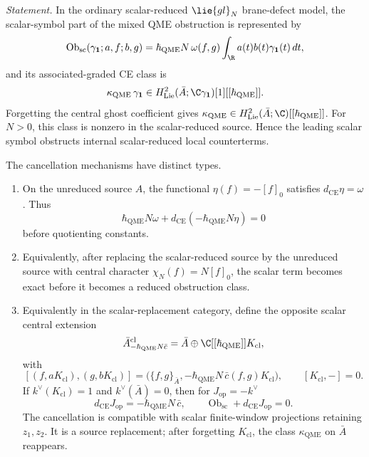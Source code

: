 \documentclass[11pt]{memoir}
\begin{document}
\begin{thm}
  \noindent\emph{Statement.}
  In the ordinary scalar-reduced \(\lie{gl}_N\) brane-defect model, the
  scalar-symbol part of the mixed QME obstruction is represented by
  \[
    \operatorname{Ob}_{\mathrm{sc}}(\gamma_{\mathbf 1};a,f;b,g)
    =
    \hbar_{\mathrm{QME}}N\,\omega(f,g)
    \int_\R a(t)b(t)\gamma_{\mathbf 1}(t)\,dt ,
  \]
  and its associated-graded CE class is
  \[
    \kappa_{\mathrm{QME}}\,\gamma_{\mathbf 1}
    \in H^2_{\mathrm{Lie}}(\bar A;\C\gamma_{\mathbf 1})[1]
      [[\hbar_{\mathrm{QME}}]] .
  \]
  Forgetting the central ghost coefficient gives
  \(\kappa_{\mathrm{QME}}\in
  H^2_{\mathrm{Lie}}(\bar A;\C)[[\hbar_{\mathrm{QME}}]]\).
  For \(N>0\), this class is nonzero in the scalar-reduced source.  Hence the
  leading scalar symbol obstructs internal scalar-reduced local counterterms.

  The cancellation mechanisms have distinct types.
  \begin{enumerate}
    \item On the unreduced source \(A\), the functional
      \(\eta(f)=-[f]_0\) satisfies \(d_{\mathrm{CE}}\eta=\omega\).  Thus
      \[
        \hbar_{\mathrm{QME}}N\omega
        +d_{\mathrm{CE}}(-\hbar_{\mathrm{QME}}N\eta)=0
      \]
      before quotienting constants.
    \item Equivalently, after replacing the scalar-reduced source by the
      unreduced source with central character
      \(\chi_N(f)=N[f]_0\), the scalar term becomes exact before it becomes
      a reduced obstruction class.
    \item Equivalently in the scalar-replacement category, define the
      opposite scalar central extension
      \[
        \bar A^{\mathrm{cl}}_{-\hbar_{\mathrm{QME}}N\bar c}
        =
        \bar A\oplus\C[[\hbar_{\mathrm{QME}}]]K_{\mathrm{cl}},
      \]
      with
      \[
        [(f,aK_{\mathrm{cl}}),(g,bK_{\mathrm{cl}})]
        =
        \bigl(\{f,g\}_{\bar A},
        -\hbar_{\mathrm{QME}}N\,\bar c(f,g)K_{\mathrm{cl}}\bigr),
        \qquad [K_{\mathrm{cl}},-]=0 .
      \]
      If \(k^\vee(K_{\mathrm{cl}})=1\) and
      \(k^\vee(\bar A)=0\), then for
      \(J_{\mathrm{op}}=-k^\vee\)
      \[
        d_{\mathrm{CE}}J_{\mathrm{op}}=-\hbar_{\mathrm{QME}}N\,\bar c,
        \qquad
        \operatorname{Ob}_{\mathrm{sc}}+d_{\mathrm{CE}}J_{\mathrm{op}}=0 .
      \]
      The cancellation is compatible with scalar finite-window
      projections retaining \(z_1,z_2\).  It is a source replacement;
      after forgetting \(K_{\mathrm{cl}}\), the class
      \(\kappa_{\mathrm{QME}}\) on \(\bar A\) reappears.

\end{enumerate}
\end{thm}
\end{document}
